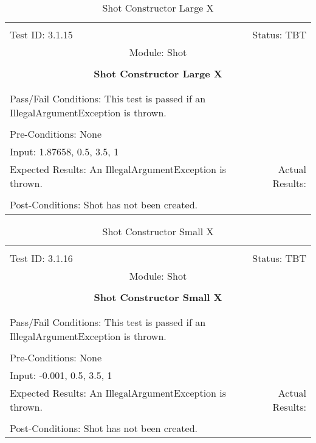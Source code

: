 \documentclass[titlepage]{article}
\begin{document}
\begin{center}%
\begin{table}
\begin{tabular}{|l r|}\hline&\\[-2mm]
	Test ID: 3.1.15	&Status: TBT\\[-3mm]
	\multicolumn{2}{|c|}{Module: Shot}\\&\\
	\multicolumn{2}{|c|}{\textbf{\large{Shot Constructor Large X}}}\\&\\\hline&\\[-3mm]
	\multicolumn{2}{|p{\textwidth}|}{Pass/Fail Conditions: This test is passed if an IllegalArgumentException is thrown.}\\[1mm]\hline&\\[-3mm]
	\multicolumn{2}{|p{\textwidth}|}{Pre-Conditions: None}\\[4mm]
	\multicolumn{2}{|p{\textwidth}|}{Input: 1.87658, 0.5, 3.5, 1}\\[2mm]\hline
	\multicolumn{1}{|p{0.49\textwidth}}{Expected Results: An IllegalArgumentException is thrown.}	&\multicolumn{1}{|p{0.45\textwidth}|}{Actual Results: }\\\hline&\\[-3mm]
	\multicolumn{2}{|p{\textwidth}|}{Post-Conditions: Shot has not been created.}\\\hline
\end{tabular}
\caption{Shot Constructor Large X}
\end{table}
\end{center}

\begin{center}%
\begin{table}
\begin{tabular}{|l r|}\hline&\\[-2mm]
	Test ID: 3.1.16	&Status: TBT\\[-3mm]
	\multicolumn{2}{|c|}{Module: Shot}\\&\\
	\multicolumn{2}{|c|}{\textbf{\large{Shot Constructor Small X}}}\\&\\\hline&\\[-3mm]
	\multicolumn{2}{|p{\textwidth}|}{Pass/Fail Conditions: This test is passed if an IllegalArgumentException is thrown.}\\[1mm]\hline&\\[-3mm]
	\multicolumn{2}{|p{\textwidth}|}{Pre-Conditions: None}\\[4mm]
	\multicolumn{2}{|p{\textwidth}|}{Input: -0.001, 0.5, 3.5, 1}\\[2mm]\hline
	\multicolumn{1}{|p{0.49\textwidth}}{Expected Results: An IllegalArgumentException is thrown.}	&\multicolumn{1}{|p{0.45\textwidth}|}{Actual Results: }\\\hline&\\[-3mm]
	\multicolumn{2}{|p{\textwidth}|}{Post-Conditions: Shot has not been created.}\\\hline
\end{tabular}
\caption{Shot Constructor Small X}
\end{table}
\end{center}
\end{document}
